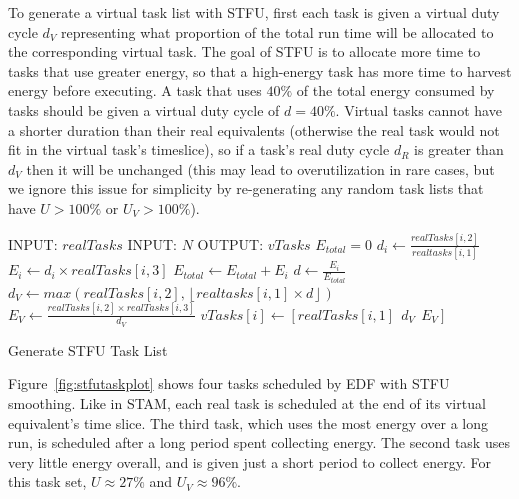 To generate a virtual task list with STFU, first each task is given a virtual duty cycle $d_V$ representing what proportion of the total run time will be allocated to the corresponding virtual task.  The goal of STFU is to allocate more time to tasks that use greater energy, so that a high-energy task has more time to harvest energy before executing.  A task that uses $40\%$ of the total energy consumed by tasks should be given a virtual duty cycle of $d=40\%$.  Virtual tasks cannot have a shorter duration than their real equivalents (otherwise the real task would not fit in the virtual task's timeslice), so if a task's real duty cycle $d_R$ is greater than $d_V$ then it will be unchanged (this may lead to overutilization in rare cases, but we ignore this issue for simplicity by re-generating any random task lists that have $U > 100\%$ or $U_V > 100\%$).
\begin{algorithm}[htb]
\label{alg:stfualg}
\begin{algorithmic}
\STATE INPUT: $realTasks$  
\STATE INPUT: $N$ 
\STATE OUTPUT: $vTasks$ 
\STATE $E_{total} = 0$
\STATE $d_i \gets \frac{realTasks[i, 2]}{realtasks[i,1]}$
\STATE $E_i \gets d_i \times realTasks[i,3]$
\STATE $E_{total} \gets E_{total} + E_i$
\ENDFOR
{}
\STATE $d \gets \frac{E_i}{E_{total}}$
\STATE $d_{V} \gets max(realTasks[i, 2], \left \lfloor realtasks[i, 1] \times d \right \rfloor)$
\STATE $E_V \gets \frac{realTasks[i,2]\times realTasks[i,3]}{d_{V}}$
\STATE $vTasks[i] \gets [realTasks[i,1]~~d_{V}~~E_V]$
\ENDFOR
\end{algorithmic}
\caption{Generate STFU Task List}
\end{algorithm}

Figure~\ref{fig:stfutaskplot} shows four tasks scheduled by EDF with STFU smoothing.  Like in STAM, each real task is scheduled at the end of its virtual equivalent's time slice.  The third task, which uses the most energy over a long run, is scheduled after a long period spent collecting energy.  The second task uses very little energy overall, and is given just a short period to collect energy.  For this task set, $U \approx 27\%$ and $U_V \approx 96\%$.

